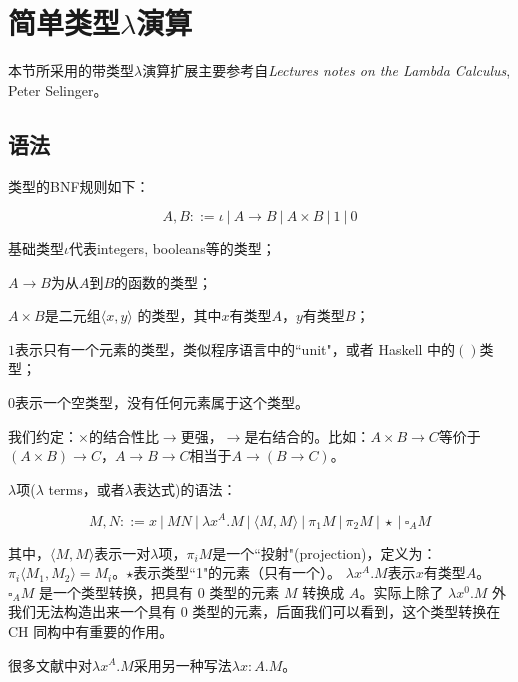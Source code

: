 \section{简单类型$\lambda$演算}

本节所采用的带类型$\lambda$演算扩展主要参考自\emph{Lectures notes on the Lambda Calculus}, Peter Selinger。

\subsection{语法}

类型的BNF规则如下：

$$A, B ::= \iota \ | \ A \to B \ | \ A \times B  \ | \ 1 \ | \ 0$$

\begin{tightenum}
  \item 基础类型$\iota$代表integers, booleans等的类型；
  \item $A \to B$为从$A$到$B$的函数的类型；
  \item $A \times B$是二元组$\langle x, y \rangle$ 的类型，其中$x$有类型$A$，$y$有类型$B$；
  \item $1$表示只有一个元素的类型，类似程序语言中的``unit"，或者 Haskell 中的$()$类型；
  \item $0$表示一个空类型，没有任何元素属于这个类型。
\end{tightenum}


我们约定：$\times$的结合性比$\to$更强，$\to$是右结合的。比如：$A \times B \to C$等价于$(A \times B) \to C$，$A \to B \to C$相当于$A \to (B \to C)$。


$\lambda$项($\lambda$ terms，或者$\lambda$表达式)的语法：

$$M, N ::= x \ | \ M N \ | \ \lambda x^A . M \ | \ \langle M, M \rangle \ | \ \pi_1 M \ | \ \pi_2 M \ | \ \star \ | \ \square_{A} M$$

其中，$\langle M, M \rangle$表示一对$\lambda$项，$\pi_i M$是一个``投射"(projection)，定义为：$\pi_i \langle M_1, M_2 \rangle = M_i$。$\star$表示类型``1"的元素（只有一个）。 $\lambda x^A. M$表示$x$有类型$A$。$\square_{A} M$ 是一个类型转换，把具有 $0$ 类型的元素 $M$ 转换成 $A$。实际上除了 $\lambda x^0. M$ 外我们无法构造出来一个具有 $0$ 类型的元素，后面我们可以看到，这个类型转换在 CH 同构中有重要的作用。

\begin{rem}

很多文献中对$\lambda x^A. M$采用另一种写法$\lambda x:A. M$。
\end{rem}


